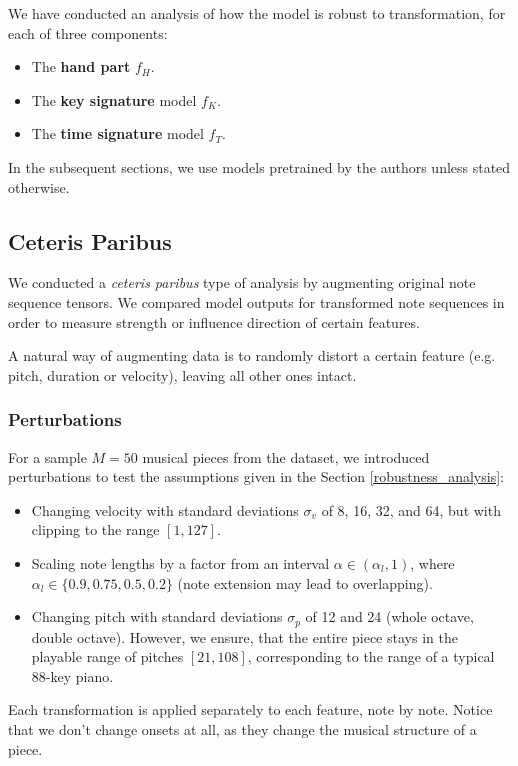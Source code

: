 We have conducted an analysis of how the model is robust to transformation, for each of three components: \begin{itemize}
	\item The \textbf{hand part} $f_H$.
	\item The \textbf{key signature} model $f_K$.
	\item The \textbf{time signature} model $f_T$.
\end{itemize}

In the subsequent sections, we use models pretrained by the authors unless stated otherwise.

\subsection{Ceteris Paribus}

We conducted a \emph{ceteris paribus} type of analysis by augmenting original note sequence tensors. We compared model outputs for transformed note sequences in order to measure strength or influence direction of certain features.

A natural way of augmenting data is to randomly distort a certain feature (e.g. pitch, duration or velocity), leaving all other ones intact. 

\subsubsection{Perturbations} \label{perturbations}

For a sample $M = 50$ musical pieces from the dataset, we introduced perturbations to test the assumptions given in the Section \ref{robustness_analysis}: \begin{itemize}
	\item Changing velocity with standard deviations $\sigma_v$ of 8, 16, 32, and 64, but with clipping to the range $[1, 127]$.
	\item Scaling note lengths by a factor from an interval $\alpha\in(\alpha_l,1)$, where $\alpha_l\in\{0.9, 0.75, 0.5, 0.2\}$ (note extension may lead to overlapping).
	\item Changing pitch with standard deviations $\sigma_p$ of 12 and 24 (whole octave, double octave). However, we ensure, that the entire piece stays in the playable range of pitches $[21, 108]$, corresponding to the range of a typical $88$-key piano.
\end{itemize}

Each transformation is applied separately to each feature, note by note. Notice that we don't change onsets at all, as they change the musical structure of a piece.

